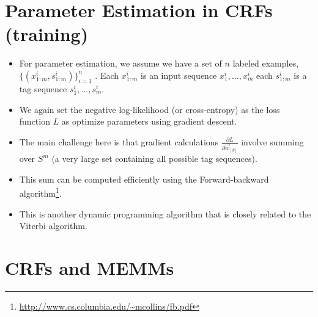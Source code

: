 \section{Parameter Estimation in CRFs (training)}


\begin{itemize}
\item For parameter estimation, we assume we have a set of $n$ labeled examples, $\{(x_{1:m}^i, s_{1:m}^i )\}_{i=1}^n$ . Each $x_{1:m}^i$ is an input sequence $x_1^i, \dots , x_m^i$ each $s_{1:m}^i$ is a tag sequence $s_1^i, \dots , s_m^i$.

\item We again set the negative log-likelihood (or cross-entropy) as the loss function $L$ as optimize parameters using gradient descent.

\item The main challenge here is that gradient calculations $\frac{\partial L}{\partial \vec{w}_{[k]}}$ involve summing over $S^m$ (a very large set containing all possible tag sequences).

\item This sum can be computed efficiently using the Forward-backward algorithm\footnote{\url{http://www.cs.columbia.edu/~mcollins/fb.pdf}}. 

\item This is another dynamic programming algorithm that is closely related
to the Viterbi algorithm.

\end{itemize}



\section{CRFs and MEMMs}

